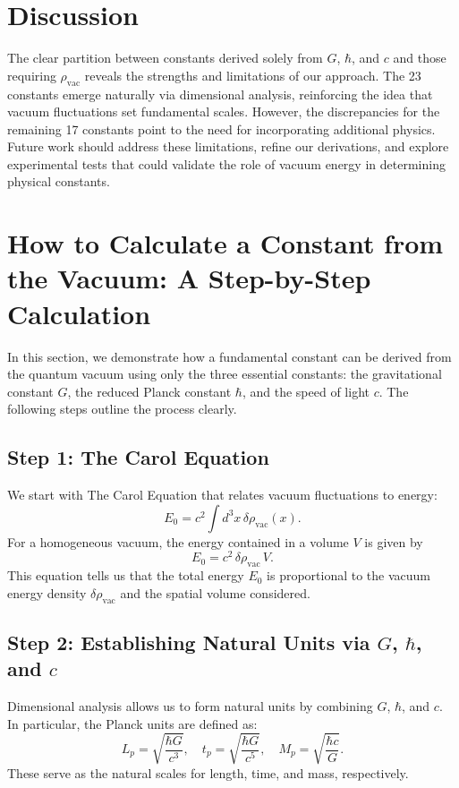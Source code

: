 \documentclass[12pt]{article}
\begin{document}
\section{Discussion}
The clear partition between constants derived solely from \(G\), \(\hbar\), and \(c\) and those requiring \(\rho_{\text{vac}}\) reveals the strengths and limitations of our approach. The 23 constants emerge naturally via dimensional analysis, reinforcing the idea that vacuum fluctuations set fundamental scales. However, the discrepancies for the remaining 17 constants point to the need for incorporating additional physics. Future work should address these limitations, refine our derivations, and explore experimental tests that could validate the role of vacuum energy in determining physical constants.

\section{How to Calculate a Constant from the Vacuum: A Step-by-Step Calculation}
In this section, we demonstrate how a fundamental constant can be derived from the quantum vacuum using only the three essential constants: the gravitational constant \(G\), the reduced Planck constant \(\hbar\), and the speed of light \(c\). The following steps outline the process clearly.

\subsection{Step 1: The Carol Equation}
We start with The Carol Equation that relates vacuum fluctuations to energy:
\[
E_0 = c^2 \int d^3x\, \delta \rho_{\text{vac}}(x).
\]
For a homogeneous vacuum, the energy contained in a volume \(V\) is given by
\[
E_0 = c^2\, \delta \rho_{\text{vac}}\, V.
\]
This equation tells us that the total energy \(E_0\) is proportional to the vacuum energy density \(\delta \rho_{\text{vac}}\) and the spatial volume considered.

\subsection{Step 2: Establishing Natural Units via \(G\), \(\hbar\), and \(c\)}
Dimensional analysis allows us to form natural units by combining \(G\), \(\hbar\), and \(c\). In particular, the Planck units are defined as:
\[
L_p = \sqrt{\frac{\hbar G}{c^3}},\quad t_p = \sqrt{\frac{\hbar G}{c^5}},\quad M_p = \sqrt{\frac{\hbar c}{G}}.
\]
These serve as the natural scales for length, time, and mass, respectively.
\end{document}
